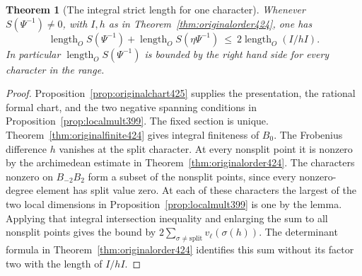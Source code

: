 \documentclass[a4paper,11pt]{article}
\newtheorem{theorem}[proposition]{Theorem}
\theoremstyle{definition}
\theoremstyle{remark}
\numberwithin{equation}{section}
\begin{document}
\begin{theorem}[The integral strict length for one character]\leavevmode
\label{thm:strictlarge425}
Whenever \(S(\Psi^{-1})\ne0\), with \(I,h\) as in
Theorem~\ref{thm:originalorder424}, one has
\[
 \operatorname{length}_O S(\Psi^{-1})+
 \operatorname{length}_O S(\eta\Psi^{-1})
       \ \le\ 2\operatorname{length}_O(I/hI).
\]
In particular \(\operatorname{length}_O S(\Psi^{-1})\) is
bounded by the right hand side for every character in the range.
\end{theorem}
\begin{proof}
Proposition~\ref{prop:originalchart425} supplies the presentation,
the rational formal chart, and the two negative spanning conditions
in Proposition~\ref{prop:localmult399}. The fixed section is
unique. Theorem~\ref{thm:originalfinite424} gives integral
finiteness of \(B_0\). The Frobenius difference \(h\) vanishes at
the split character. At every nonsplit point it is nonzero by the
archimedean estimate in Theorem~\ref{thm:originalorder424}.
The characters nonzero on \(B_{-2}B_2\) form a subset of the
nonsplit points, since every nonzero-degree element has split
value zero. At each of these characters the largest of the two
local dimensions in Proposition~\ref{prop:localmult399} is one
by the lemma. Applying that integral intersection inequality
and enlarging the sum to all nonsplit points gives the bound
by \(2\sum_{\sigma\ne\mathrm{split}}v_\ell(\sigma(h))\).
The determinant formula in Theorem~\ref{thm:originalorder424}
identifies this sum without its factor two with the length of
\(I/hI\).
\end{proof}
\end{document}
